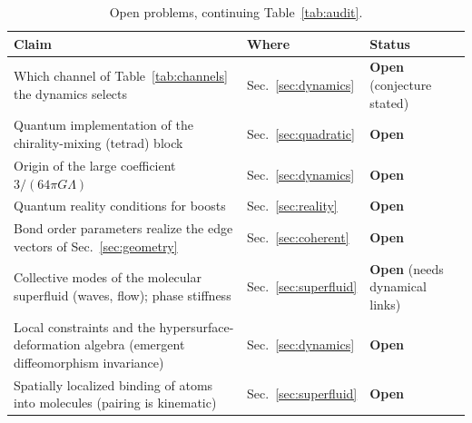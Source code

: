 \documentclass[reprint,aps,prd,amsmath,amssymb,superscriptaddress,nofootinbib,floatfix]{revtex4-2}
\theoremstyle{plain}
\theoremstyle{definition}
\theoremstyle{remark}
\begin{document}
\begin{table}[t]
\caption{\label{tab:open}Open problems, continuing Table~\ref{tab:audit}.}
\begin{ruledtabular}
\begin{tabular}{lll}
\parbox[t]{0.52\textwidth}{\raggedright Claim\strut} & \parbox[t]{0.17\textwidth}{\raggedright Where\strut} & \parbox[t]{0.25\textwidth}{\raggedright Status\strut}  \\
\hline
\parbox[t]{0.52\textwidth}{\raggedright Which channel of Table~\ref{tab:channels} the dynamics selects\strut} & \parbox[t]{0.17\textwidth}{\raggedright Sec.~\ref{sec:dynamics}\strut} & \parbox[t]{0.25\textwidth}{\raggedright \textbf{Open} (conjecture stated)\strut} \\
\parbox[t]{0.52\textwidth}{\raggedright Quantum implementation of the chirality-mixing (tetrad) block\strut} & \parbox[t]{0.17\textwidth}{\raggedright Sec.~\ref{sec:quadratic}\strut} & \parbox[t]{0.25\textwidth}{\raggedright \textbf{Open}\strut} \\
\parbox[t]{0.52\textwidth}{\raggedright Origin of the large coefficient $3/(64\pi G\Lambda)$\strut} & \parbox[t]{0.17\textwidth}{\raggedright Sec.~\ref{sec:dynamics}\strut} & \parbox[t]{0.25\textwidth}{\raggedright \textbf{Open}\strut} \\
\parbox[t]{0.52\textwidth}{\raggedright Quantum reality conditions for boosts\strut} & \parbox[t]{0.17\textwidth}{\raggedright Sec.~\ref{sec:reality}\strut} & \parbox[t]{0.25\textwidth}{\raggedright \textbf{Open}\strut} \\
\parbox[t]{0.52\textwidth}{\raggedright Bond order parameters realize the edge vectors of Sec.~\ref{sec:geometry}\strut} & \parbox[t]{0.17\textwidth}{\raggedright Sec.~\ref{sec:coherent}\strut} & \parbox[t]{0.25\textwidth}{\raggedright \textbf{Open}\strut} \\
\parbox[t]{0.52\textwidth}{\raggedright Collective modes of the molecular superfluid (waves, flow); phase stiffness\strut} & \parbox[t]{0.17\textwidth}{\raggedright Sec.~\ref{sec:superfluid}\strut} & \parbox[t]{0.25\textwidth}{\raggedright \textbf{Open} (needs dynamical links)\strut} \\
\parbox[t]{0.52\textwidth}{\raggedright Local constraints and the hypersurface-deformation algebra (emergent diffeomorphism invariance)\strut} & \parbox[t]{0.17\textwidth}{\raggedright Sec.~\ref{sec:dynamics}\strut} & \parbox[t]{0.25\textwidth}{\raggedright \textbf{Open}\strut} \\
\parbox[t]{0.52\textwidth}{\raggedright Spatially localized binding of atoms into molecules (pairing is kinematic)\strut} & \parbox[t]{0.17\textwidth}{\raggedright Sec.~\ref{sec:superfluid}\strut} & \parbox[t]{0.25\textwidth}{\raggedright \textbf{Open}\strut} \\

\end{tabular}
\end{ruledtabular}
\end{table}
\end{document}
